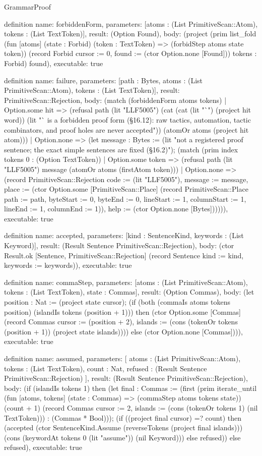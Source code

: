 \begin{lexlean}{GrammarProof}
\begin{semanticmodule}
definition{
  name: forbiddenForm,
  parameters: [atoms : (List PrimitiveScan::Atom), tokens : (List TextToken)],
  result: (Option Found),
  body: (project (prim list_fold (fun [atoms] (state : Forbid) (token : TextToken) => (forbidStep atoms state token)) (record Forbid {cursor := 0, found := (ctor Option.none [Found])}) tokens : Forbid) found),
  executable: true
}

definition{
  name: failure,
  parameters: [path : Bytes, atoms : (List PrimitiveScan::Atom), tokens : (List TextToken)],
  result: PrimitiveScan::Rejection,
  body: (match (forbiddenForm atoms tokens)
    | Option.some hit => (refusal path (lit "LLF5005") (cat (cat (lit "`") (project hit word)) (lit "` is a forbidden proof form (§16.12): raw tactics, automation, tactic combinators, and proof holes are never accepted")) (atomOr atoms (project hit atom)))
    | Option.none => (let message : Bytes := (lit "not a registered proof sentence; the exact simple sentences are fixed (§16.2)"); (match (prim index tokens 0 : (Option TextToken))
      | Option.some token => (refusal path (lit "LLF5005") message (atomOr atoms (firstAtom token)))
      | Option.none => (record PrimitiveScan::Rejection {code := (lit "LLF5005"), message := message, place := (ctor Option.some [PrimitiveScan::Place] (record PrimitiveScan::Place {path := path, byteStart := 0, byteEnd := 0, lineStart := 1, columnStart := 1, lineEnd := 1, columnEnd := 1})), help := (ctor Option.none [Bytes])})))),
  executable: true
}

definition{
  name: accepted,
  parameters: [kind : SentenceKind, keywords : (List Keyword)],
  result: (Result Sentence PrimitiveScan::Rejection),
  body: (ctor Result.ok [Sentence, PrimitiveScan::Rejection] (record Sentence {kind := kind, keywords := keywords})),
  executable: true
}

definition{
  name: commaStep,
  parameters: [atoms : (List PrimitiveScan::Atom), tokens : (List TextToken), state : Commas],
  result: (Option Commas),
  body: (let position : Nat := (project state cursor); (if (both (commaIs atoms tokens position) (islandIs tokens (position + 1))) then (ctor Option.some [Commas] (record Commas {cursor := (position + 2), islands := (cons (tokenOr tokens (position + 1)) (project state islands))})) else (ctor Option.none [Commas]))),
  executable: true
}

definition{
  name: assumed,
  parameters: [
    atoms : (List PrimitiveScan::Atom),
    tokens : (List TextToken),
    count : Nat,
    refused : (Result Sentence PrimitiveScan::Rejection)
  ],
  result: (Result Sentence PrimitiveScan::Rejection),
  body: (if (islandIs tokens 1) then (let final : Commas := (first (prim iterate_until (fun [atoms, tokens] (state : Commas) => (commaStep atoms tokens state)) (count + 1) (record Commas {cursor := 2, islands := (cons (tokenOr tokens 1) (nil TextToken))}) : (Commas * Bool))); (if ((project final cursor) =? count) then (accepted (ctor SentenceKind.Assume (reverseTokens (project final islands))) (cons (keywordAt tokens 0 (lit "assume")) (nil Keyword))) else refused)) else refused),
  executable: true
}


\end{semanticmodule}
\end{lexlean}

